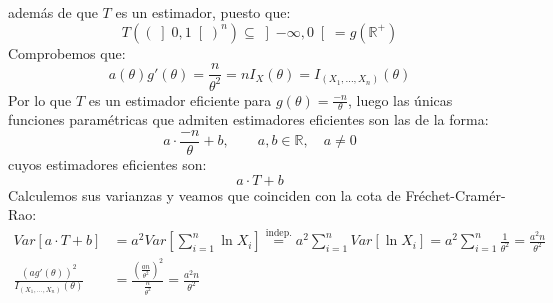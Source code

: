 \begin{ejercicio}
\begin{enumerate}[label=\alph*)]
            además de que $T$ es un estimador, puesto que:
            \begin{equation*}
                T({(\left]0,1\right[)}^{n}) \subseteq \left]-\infty,0\right[ = g(\mathbb{R}^+)
            \end{equation*}
            Comprobemos que:
            \begin{equation*}
                a(\theta)g'(\theta) = \frac{n}{\theta^2} = nI_X(\theta) = I_{(X_1, \ldots, X_n)}(\theta)
            \end{equation*}
            Por lo que $T$ es un estimador eficiente para $g(\theta) = \frac{-n}{\theta}$, luego las únicas funciones paramétricas que admiten estimadores eficientes son las de la forma:
            \begin{equation*}
                a\cdot \frac{-n}{\theta} + b, \qquad a,b\in \mathbb{R}, \quad a\neq 0
            \end{equation*}
            cuyos estimadores eficientes son:
            \begin{equation*}
                a\cdot T + b
            \end{equation*}
            Calculemos sus varianzas y veamos que coinciden con la cota de Fréchet-Cramér-Rao:
            \begin{align*}
                Var\left[a\cdot T+b\right] &= a^2 Var\left[\sum_{i=1}^{n}\ln X_i\right] \stackrel{\text{indep.}}{=} a^2 \sum_{i=1}^{n}Var[\ln X_i] = a^2 \sum_{i=1}^{n} \frac{1}{\theta^2} = \frac{a^2n}{\theta^2} \\
                \frac{{(ag'(\theta))}^{2}}{I_{(X_1,\ldots, X_n)}(\theta)} &= \frac{{(\frac{an}{\theta^2})}^{2}}{\frac{n}{\theta^2}} = \frac{a^2n}{\theta^2}
            \end{align*}
    \end{enumerate}
\end{ejercicio}


